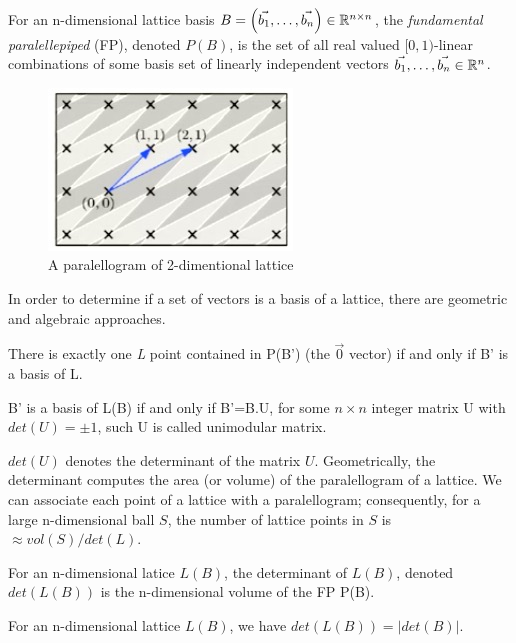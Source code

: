 \begin{definition}
  For an n-dimensional lattice basis
  $B = \left( \vec{b_1}, \dots, \vec{b_n} \right) \in \mathbb{R}^{n \times n}$, the
  \emph{fundamental paralellepiped} (FP), denoted $P(B)$, is the set of all real
  valued $[0,1)$-linear combinations of some basis set of linearly independent
  vectors $\vec{b_1}, \dots ,\vec{b_n} \in \mathbb{R}^n$.
  \begin{figure}[h]
    \centering \includegraphics[scale=0.7]{parallelopiped}
    \caption{A paralellogram of 2-dimentional lattice}
    \label{fig:paralellopiped}
  \end{figure}
\end{definition}
In order to determine if a set of vectors is a basis of a lattice, there are
geometric and algebraic approaches.
\begin{lemma}
  There is exactly one \emph{L} point contained in P(B') (the $\vec{0}$ vector)
  if and only if B' is a basis of L.
  \label{lem:parallelopiped}
\end{lemma}
\begin{lemma}
  B' is a basis of L(B) if and only if B'=B.U, for some $n \times n$ integer
  matrix U with $det(U) = \pm 1$, such U is called unimodular matrix.
  \label{lem:detBasis}
\end{lemma}
$det(U)$ denotes the determinant of the matrix $U$.  Geometrically, the
determinant computes the area (or volume) of the paralellogram of a lattice. We
can associate each point of a lattice with a paralellogram; consequently, for a
large n-dimensional ball $S$, the number of lattice points in $S$ is
$\approx vol(S) / det(L)$.
\begin{definition}[Determinant]
  \label{def:determinant}
  For an n-dimensional latice $L(B)$, the determinant of $L(B)$, denoted
  $det(L(B))$ is the n-dimensional volume of the FP P(B).
\end{definition}
\begin{lemma}
  For an n-dimensional lattice $L(B)$, we have $det(L(B)) = |det(B)|$.
  \label{lem:determinant2}
\end{lemma}
